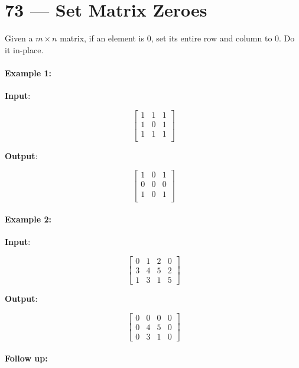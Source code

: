 \section{73 --- Set Matrix Zeroes}
Given a $m \times n$ matrix, if an element is 0, set its entire row and column to 0. Do it in-place.

\paragraph{Example 1:}
\begin{flushleft}


\textbf{Input}: 

\[
\begin{bmatrix}
1 & 1 & 1\\
1 & 0 & 1\\
1 & 1 & 1\\
\end{bmatrix}
\]

\textbf{Output}: 

\[
\begin{bmatrix}
1 & 0 & 1\\
0 & 0 & 0\\
1 & 0 & 1\\
\end{bmatrix}
\]

\end{flushleft}


\paragraph{Example 2:}
\begin{flushleft}


\textbf{Input}: 

\[
\begin{bmatrix}
0 & 1 & 2 & 0\\
3 & 4 & 5 & 2\\
1 & 3 & 1 & 5
\end{bmatrix}
\]

\textbf{Output}: 

\[
\begin{bmatrix}
0 & 0 & 0 & 0\\
0 & 4 & 5 & 0\\
0 & 3 & 1 & 0
\end{bmatrix}
\]
\end{flushleft}
\paragraph{Follow up:}

